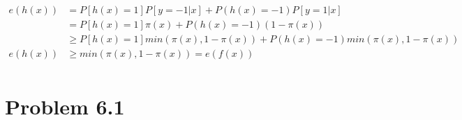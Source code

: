 \documentclass{article}
\begin{document}
\begin{equation}
    \begin{split}
        e(h(x)) &= P[h(x)=1]P[y = -1|x] + P(h(x) = -1) P[y = 1|x] \\
        &= P[h(x)=1]\pi(x) + P(h(x) = -1)(1 - \pi(x)) \\
        & \geq P[h(x)=1] min(\pi(x), 1 - \pi(x)) + P(h(x) = -1) min(\pi(x), 1 - \pi(x)) \\
        e(h(x)) &\geq min(\pi(x), 1 - \pi(x)) = e(f(x)) \\
    \end{split}
\end{equation}

\section{Problem 6.1}
\end{document}

